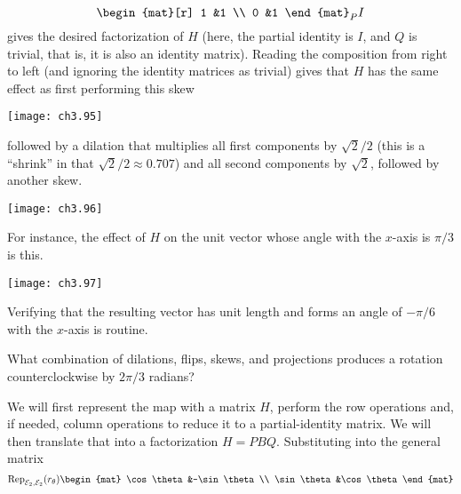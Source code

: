 \begin{exercises}
\begin{answer}
\begin{exparts}
\begin{equation*}
{\begin{mat}[r]
                1  &1 \\
                0  &1
              \end{mat}
             }_P
            I
          \end{equation*}
          gives the desired factorization of $H$ (here, the partial
          identity is $I$, and $Q$ is trivial, that is, it is also an identity
          matrix).
        \partsitem Reading the composition from right to left (and ignoring the
          identity matrices as trivial) gives that $H$ has the same
          effect as first performing this skew 
          \begin{center}
            \texttt{[image: ch3.95]}
         \end{center}
         followed by a dilation that multiplies all first components by 
         $\sqrt{2}/2$ (this is a ``shrink'' in that $\sqrt{2}/2\approx0.707$) 
         and all second components by $\sqrt{2}$,
         followed by another skew. 
          \begin{center}
            \texttt{[image: ch3.96]}
         \end{center}
         For instance, the effect of $H$ on the unit vector whose angle with
         the $x$-axis is $\pi/3$ is this.
          \begin{center}
            \texttt{[image: ch3.97]}
         \end{center}
         Verifying that the resulting vector has unit length and forms an
         angle of $-\pi/6$ with the $x$-axis is routine. 
      \end{exparts}
    \end{answer}
  \item 
    What combination of dilations, flips, skews, and projections
    produces a rotation counterclockwise by $2\pi/3$ radians?
    \begin{answer}
      We will first represent the map with a matrix $H$,
      perform the row operations and, if needed, column operations
      to reduce it to a partial-identity matrix.
      We will then translate that into a factorization $H=PBQ$.
      Substituting into the general matrix
          \begin{equation*}
            \rep{r_\theta}{\stdbasis_2,\stdbasis_2}
            \begin{mat}
              \cos\theta  &-\sin\theta  \\
              \sin\theta  &\cos\theta
            \end{mat}
          \end{equation*}

\end{answer}
\end{exercises}
